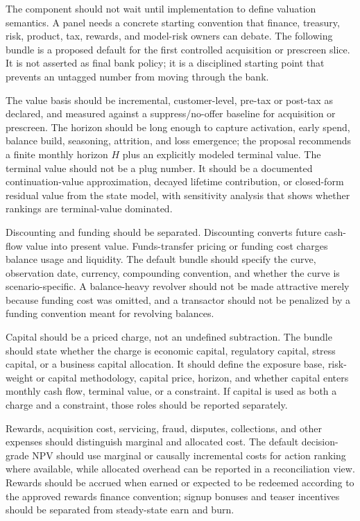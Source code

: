 \documentclass[11pt]{article}
\newcommand{\1}{\mathbf{1}}
\begin{document}
The component should not wait until implementation to define valuation
semantics. A panel needs a concrete starting convention that finance, treasury,
risk, product, tax, rewards, and model-risk owners can debate. The following
bundle is a proposed default for the first controlled acquisition or prescreen
slice. It is not asserted as final bank policy; it is a disciplined starting
point that prevents an untagged number from moving through the bank.

The value basis should be incremental, customer-level, pre-tax or post-tax as
declared, and measured against a suppress/no-offer baseline for acquisition or
prescreen. The horizon should be long enough to capture activation, early
spend, balance build, seasoning, attrition, and loss emergence; the proposal
recommends a finite monthly horizon $H$ plus an explicitly modeled terminal
value. The terminal value should not be a plug number. It should be a
documented continuation-value approximation, decayed lifetime contribution, or
closed-form residual value from the state model, with sensitivity analysis that
shows whether rankings are terminal-value dominated.

Discounting and funding should be separated. Discounting converts future
cash-flow value into present value. Funds-transfer pricing or funding cost
charges balance usage and liquidity. The default bundle should specify the
curve, observation date, currency, compounding convention, and whether the
curve is scenario-specific. A balance-heavy revolver should not be made
attractive merely because funding cost was omitted, and a transactor should
not be penalized by a funding convention meant for revolving balances.

Capital should be a priced charge, not an undefined subtraction. The bundle
should state whether the charge is economic capital, regulatory capital,
stress capital, or a business capital allocation. It should define the exposure
base, risk-weight or capital methodology, capital price, horizon, and whether
capital enters monthly cash flow, terminal value, or a constraint. If capital
is used as both a charge and a constraint, those roles should be reported
separately.

Rewards, acquisition cost, servicing, fraud, disputes, collections, and other
expenses should distinguish marginal and allocated cost. The default
decision-grade NPV should use marginal or causally incremental costs for action
ranking where available, while allocated overhead can be reported in a
reconciliation view. Rewards should be accrued when earned or expected to be
redeemed according to the approved rewards finance convention; signup bonuses
and teaser incentives should be separated from steady-state earn and burn.
\end{document}
